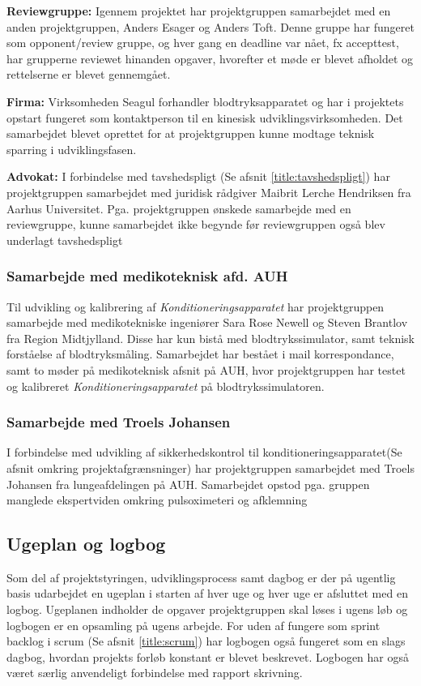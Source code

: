 \textbf{Reviewgruppe:} Igennem projektet har projektgruppen samarbejdet med en anden projektgruppen, Anders Esager og Anders Toft. Denne gruppe har fungeret som opponent/review gruppe, og hver gang en deadline var nået, fx accepttest, har grupperne reviewet hinanden opgaver, hvorefter et møde er blevet afholdet og rettelserne er blevet gennemgået.  

\textbf{Firma:} Virksomheden Seagul forhandler blodtryksapparatet og har i projektets opstart fungeret som kontaktperson til en kinesisk udviklingsvirksomheden. Det samarbejdet blevet oprettet for at projektgruppen kunne modtage teknisk sparring i udviklingsfasen. 

\textbf{Advokat:} I forbindelse med tavshedspligt (Se afsnit \ref{title:tavshedspligt}) har projektgruppen samarbejdet med juridisk rådgiver Maibrit Lerche Hendriksen fra Aarhus Universitet. Pga. projektgruppen ønskede samarbejde med en reviewgruppe, kunne samarbejdet ikke begynde før reviewgruppen også blev underlagt tavshedspligt 

\subsubsection{Samarbejde med medikoteknisk afd. AUH}
Til udvikling og kalibrering af \textit{Konditioneringsapparatet} har projektgruppen samarbejde med medikotekniske ingeniører  Sara Rose Newell og Steven Brantlov fra Region Midtjylland. Disse har kun bistå med blodtrykssimulator, samt teknisk forståelse af blodtryksmåling. Samarbejdet har bestået i mail korrespondance, samt to møder på medikoteknisk afsnit på AUH, hvor projektgruppen har testet og kalibreret \textit{Konditioneringsapparatet} på blodtrykssimulatoren. 

\subsubsection{Samarbejde med Troels Johansen}
I forbindelse med udvikling af sikkerhedskontrol til konditioneringsapparatet(Se afsnit  omkring projektafgrænsninger) har projektgruppen samarbejdet med Troels Johansen fra lungeafdelingen på AUH. Samarbejdet opstod pga. gruppen manglede ekspertviden omkring pulsoximeteri og afklemning 

\subsection{Ugeplan og logbog}
Som del af projektstyringen, udviklingsprocess samt dagbog er der på ugentlig basis udarbejdet en ugeplan i starten af hver uge og hver uge er afsluttet med en logbog. Ugeplanen indholder de opgaver projektgruppen skal løses i ugens løb og logbogen er en opsamling på ugens arbejde. For uden af fungere som sprint backlog i scrum (Se afsnit \ref{title:scrum}) har logbogen også fungeret som en slags dagbog, hvordan projekts forløb konstant er blevet beskrevet. Logbogen har også været særlig anvendeligt forbindelse med rapport skrivning. 

